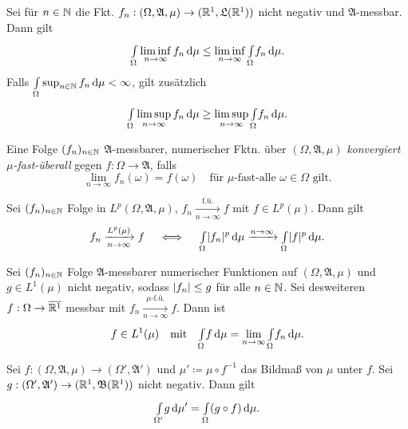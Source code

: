 \documentclass{cheat-sheet}
\newcommand{\Alg}{\mathfrak{A}} %
\newcommand{\LebAlg}{\mathfrak{L}} %
\newcommand{\Bor}{\mathfrak{B}} %
\renewcommand{\ER}{\overline{\R^1}} %
\newcommand{\IntOmu}[1]{\Int{\Omega}{}{#1}{\mu}} %
\begin{document}
\begin{lem}[Fatou]
  Sei für $n \in \mathbb{N}$ die Fkt. $f_n : (\Omega, \Alg, \mu) \to (\R^1, \LebAlg(\R^1))$ nicht negativ und $\Alg$-messbar. Dann gilt
  \[ \IntOmu{\liminf_{n \to \infty} f_n} \leq \liminf_{n \to \infty} \IntOmu{f_n}. \]
  Falls $\IntOmu{\sup_{n \in \N} f_n} < \infty$, gilt zusätzlich
  \[ \IntOmu{\limsup_{n \to \infty} f_n} \geq \limsup_{n \to \infty} \IntOmu{f_n}. \]
\end{lem}




\begin{defn}
  Eine Folge $(f_n)_{n \in \mathbb{N}}$ $\Alg$-messbarer, numerischer Fktn. über $(\Omega, \Alg, \mu)$ \emph{konvergiert $\mu$-fast-überall} gegen $f : \Omega \to \Alg$, falls
  \[ \lim_{n \to \infty} f_n(\omega) = f(\omega) \quad \text{für $\mu$-fast-alle $\omega \in \Omega$ gilt.} \]
\end{defn}


\begin{satz}[Riesz]
  Sei $(f_n)_{n \in \mathbb{N}}$ Folge in $L^p(\Omega, \Alg, \mu)$, $f_n \xrightarrow[n \to \infty]{\text{f.ü.}} f$ mit $f \in L^p(\mu)$. Dann gilt
  \[ f_n \xrightarrow[n \to \infty]{L^p(\mu)} f \quad \iff \quad {\textstyle \int\limits_{\Omega}^{}} \lvert f_n\rvert^p \,\mathrm{d} \mu \xrightarrow{n \to \infty} {\textstyle \int\limits_{\Omega}^{}} \lvert f\rvert^p \,\mathrm{d} \mu. \]
\end{satz}


\begin{satz}
  Sei $(f_n)_{n \in \mathbb{N}}$ Folge $\Alg$-messbarer numerischer Funktionen auf $(\Omega, \Alg, \mu)$ und $g \in L^1(\mu)$ nicht negativ, sodass $\lvert f_n\rvert \leq g$ für alle $n \in \mathbb{N}$. Sei desweiteren $f : \Omega \to \ER$ messbar mit $f_n \xrightarrow[n \to \infty]{\text{$\mu$-f.ü.}} f$. Dann ist
  \[ f \in L^1(\mu) \quad \text{mit} \quad {\textstyle \int\limits_{\Omega}^{}} f \,\mathrm{d} \mu = \lim_{n \to \infty} {\textstyle \int\limits_{\Omega}^{}} f_n \,\mathrm{d} \mu. \]
\end{satz}


\begin{satz}
  Sei $f : (\Omega, \Alg, \mu) \to (\Omega', \Alg')$ und $\mu' \coloneqq \mu \circ f^{-1}$ das Bildmaß von $\mu$ unter $f$. Sei $g : (\Omega', \Alg') \to (\R^1, \Bor(\R^1))$ nicht negativ. Dann gilt
  \[ {\textstyle \int\limits_{\Omega'}^{}} g \,\mathrm{d} \mu' = {\textstyle \int\limits_{\Omega}^{}} (g \circ f) \,\mathrm{d} \mu. \]
\end{satz}
\end{document}
